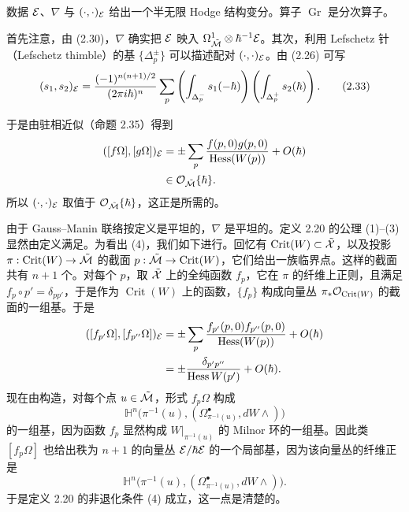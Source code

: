 \begin{proposition}
数据 $\mathcal{E}$、$\nabla$ 与 $(\cdot,\cdot)_{\mathcal{E}}$ 给出一个半无限 Hodge 结构变分。算子 $\operatorname{Gr}$ 是分次算子。
\end{proposition}

首先注意，由 (2.30)，$\nabla$ 确实把 $\mathcal{E}$ 映入 $\Omega^1_{\tilde{\mathcal{M}}}\otimes\hbar^{-1}\mathcal{E}$。其次，利用 Lefschetz 针（Lefschetz thimble）的基 $\{\Delta_p^\pm\}$ 可以描述配对 $(\cdot,\cdot)_{\mathcal{E}}$。由 (2.26) 可写
\begin{equation}
  (s_1,s_2)_{\mathcal{E}}
  =\frac{(-1)^{n(n+1)/2}}{(2\pi i\hbar)^n}\sum_p
  \left(\int_{\Delta^-_p}s_1(-\hbar)\right)
  \left(\int_{\Delta^+_p}s_2(\hbar)\right). \tag{2.33}
\end{equation}

于是由驻相近似（命题 2.35）得到
\begin{align*}
  ([f\Omega],[g\Omega])_{\mathcal{E}}
  &=\pm\sum_p\frac{f(p,0)g(p,0)}{\operatorname{Hess}(W(p))}+O(\hbar)\\
  &\in\mathcal{O}_{\tilde{\mathcal{M}}}\{\hbar\}.
\end{align*}
所以 $(\cdot,\cdot)_{\mathcal{E}}$ 取值于 $\mathcal{O}_{\tilde{\mathcal{M}}}\{\hbar\}$，这正是所需的。

由于 Gauss--Manin 联络按定义是平坦的，$\nabla$ 是平坦的。定义 2.20 的公理 (1)--(3) 显然由定义满足。为看出 (4)，我们如下进行。回忆有 $\operatorname{Crit}(W)\subset\tilde{\mathcal{X}}$，以及投影 $\pi:\operatorname{Crit}(W)\to\tilde{\mathcal{M}}$ 的截面 $p:\tilde{\mathcal{M}}\to\operatorname{Crit}(W)$，它们给出一族临界点。这样的截面共有 $n+1$ 个。对每个 $p$，取 $\tilde{\mathcal{X}}$ 上的全纯函数 $f_p$，它在 $\pi$ 的纤维上正则，且满足 $f_p\circ p'=\delta_{pp'}$，于是作为 $\operatorname{Crit}(W)$ 上的函数，$\{f_p\}$ 构成向量丛 $\pi_*\mathcal{O}_{\operatorname{Crit}(W)}$ 的截面的一组基。于是
\begin{align*}
  ([f_{p'}\Omega],[f_{p''}\Omega])_{\mathcal{E}}
  &=\pm\sum_p\frac{f_{p'}(p,0)f_{p''}(p,0)}{\operatorname{Hess}(W(p))}+O(\hbar)\\
  &=\pm\frac{\delta_{p'p''}}{\operatorname{Hess}W(p')}+O(\hbar).
\end{align*}
现在由构造，对每个点 $u\in\tilde{\mathcal{M}}$，形式 $f_p\Omega$ 构成
\[
  \mathbb{H}^n\bigl(\pi^{-1}(u),(\Omega^{\bullet}_{\pi^{-1}(u)},dW\wedge)\bigr)
\]
的一组基，因为函数 $f_p$ 显然构成 $W|_{\pi^{-1}(u)}$ 的 Milnor 环的一组基。因此类 $[f_p\Omega]$ 也给出秩为 $n+1$ 的向量丛 $\mathcal{E}/\hbar\mathcal{E}$ 的一个局部基，因为该向量丛的纤维正是
\[
  \mathbb{H}^n\bigl(\pi^{-1}(u),(\Omega^{\bullet}_{\pi^{-1}(u)},dW\wedge)\bigr).
\]
于是定义 2.20 的非退化条件 (4) 成立，这一点是清楚的。

